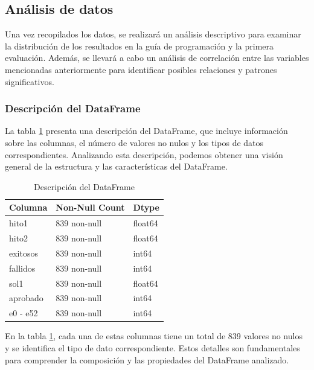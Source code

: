 \subsection{Análisis de datos}

Una vez recopilados los datos, se realizará un análisis descriptivo para examinar la distribución de los resultados en la guía de programación y la primera evaluación. Además, se llevará a cabo un análisis de correlación entre las variables mencionadas anteriormente para identificar posibles
relaciones y patrones significativos.

\subsubsection{Descripción del DataFrame}

La tabla \ref{tab:descripcion_dataframe} presenta una descripción del DataFrame, que incluye información sobre las columnas, el número de valores no nulos y los tipos de datos correspondientes. Analizando esta descripción, podemos obtener una visión general de la estructura y las características del DataFrame.

\begin{table}[H]
    \centering
    \caption{Descripción del DataFrame}
    \begin{tabular}{lll}
        \hline
        \textbf{Columna} & \textbf{Non-Null Count} & \textbf{Dtype} \\
        \hline
        hito1            & 839 non-null            & float64        \\
        hito2            & 839 non-null            & float64        \\
        exitosos         & 839 non-null            & int64          \\
        fallidos         & 839 non-null            & int64          \\
        sol1             & 839 non-null            & float64        \\
        aprobado         & 839 non-null            & int64          \\
        e0 - e52         & 839 non-null            & int64          \\
        \hline
    \end{tabular}%
    \label{tab:descripcion_dataframe}%
\end{table}%

En la tabla \ref{tab:descripcion_dataframe}, cada una de estas columnas tiene un total de 839 valores no nulos y se identifica el tipo de dato correspondiente. Estos detalles son fundamentales para comprender la composición y las propiedades del DataFrame analizado.

